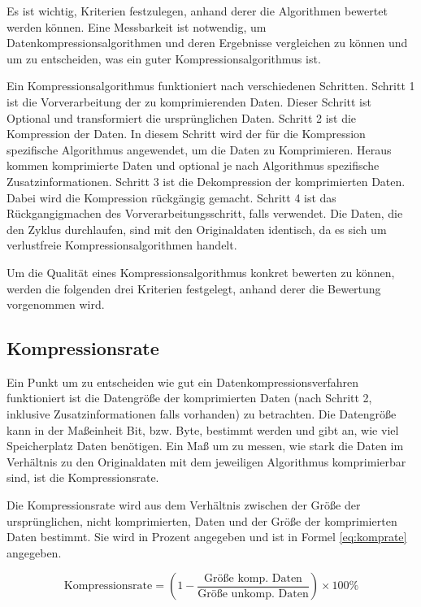 \documentclass[conference]{IEEEtran}
\begin{document}
Es ist wichtig, Kriterien festzulegen, anhand derer die Algorithmen bewertet werden können.
Eine Messbarkeit ist notwendig, um Datenkompressionsalgorithmen und deren Ergebnisse
vergleichen zu können und um zu entscheiden, was ein guter Kompressionsalgorithmus ist.

Ein Kompressionsalgorithmus funktioniert nach verschiedenen Schritten.
Schritt 1 ist die Vorverarbeitung der zu komprimierenden Daten.
Dieser Schritt ist Optional und transformiert die ursprünglichen Daten.
Schritt 2 ist die Kompression der Daten.
In diesem Schritt wird der für die Kompression spezifische Algorithmus angewendet,
um die Daten zu Komprimieren.
Heraus kommen komprimierte Daten und optional je nach Algorithmus
spezifische Zusatzinformationen.
Schritt 3 ist die Dekompression der komprimierten Daten.
Dabei wird die Kompression rückgängig gemacht.
Schritt 4 ist das Rückgangigmachen des Vorverarbeitungsschritt, falls verwendet.
Die Daten, die den Zyklus durchlaufen, sind mit den Originaldaten identisch,
da es sich um verlustfreie Kompressionsalgorithmen handelt.

Um die Qualität eines Kompressionsalgorithmus konkret bewerten zu können, werden
die folgenden drei Kriterien festgelegt, anhand derer die Bewertung vorgenommen wird.

\subsection{Kompressionsrate}

Ein Punkt um zu entscheiden wie gut ein Datenkompressionsverfahren
funktioniert ist die Datengröße der komprimierten Daten (nach Schritt 2, inklusive
Zusatzinformationen falls vorhanden) zu betrachten.
Die Datengröße kann in der Maßeinheit Bit, bzw. Byte, bestimmt werden und gibt an,
wie viel Speicherplatz Daten benötigen.
Ein Maß um zu messen, wie stark die Daten im Verhältnis zu den Originaldaten mit dem
jeweiligen Algorithmus komprimierbar sind, ist die Kompressionsrate.

Die Kompressionsrate wird aus dem Verhältnis zwischen der Größe der ursprünglichen,
nicht komprimierten, Daten und der Größe der komprimierten Daten bestimmt.
Sie wird in Prozent angegeben und ist in Formel \ref{eq:komprate} angegeben.

\begin{equation}
    \label{eq:komprate}
    \text{Kompressionsrate} = \left(1 - \frac{\text{Größe komp. Daten}}{\text{Größe unkomp. Daten}}\right) \times 100 \%
\end{equation}
\end{document}
